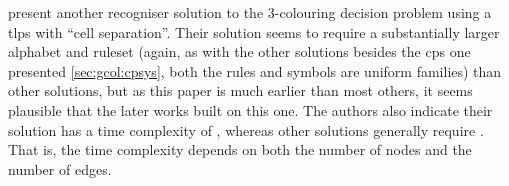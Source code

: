 \citeauthor{Wang2009} \cite{Wang2009} present another recogniser solution to the 3-colouring decision problem using a \gls{tlps} with \enquote{cell separation}.  Their solution seems to require a substantially larger alphabet and \gls{ruleset} (again, as with the other solutions besides the \gls{cps} one presented \cref{sec:gcol:cpsys}, both the rules and symbols are uniform families) than other solutions, but as this paper is much earlier than most others, it seems plausible that the later works built on this one.  The authors also indicate their solution has a time complexity of , whereas other solutions generally require .  That is, the time complexity depends on both the number of nodes and the number of edges.


